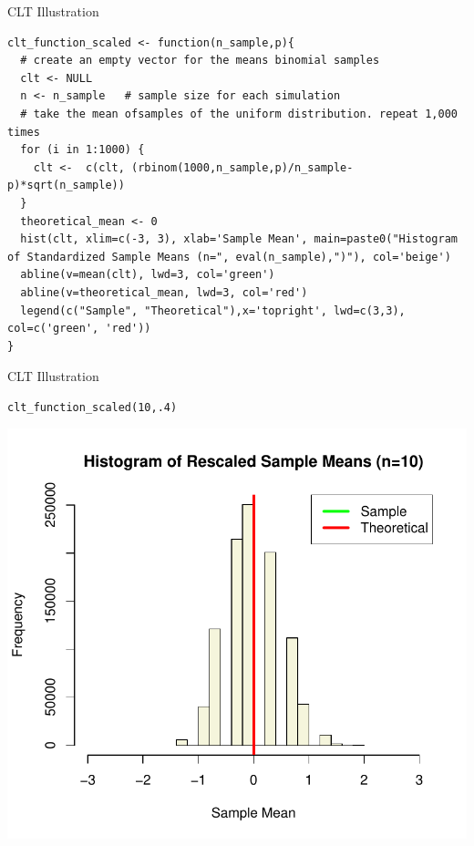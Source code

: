 \begin{frame}[fragile]{CLT Illustration}
\begin{lstlisting}
clt_function_scaled <- function(n_sample,p){
  # create an empty vector for the means binomial samples
  clt <- NULL
  n <- n_sample   # sample size for each simulation
  # take the mean ofsamples of the uniform distribution. repeat 1,000 times
  for (i in 1:1000) {
    clt <-  c(clt, (rbinom(1000,n_sample,p)/n_sample-p)*sqrt(n_sample))
  }
  theoretical_mean <- 0
  hist(clt, xlim=c(-3, 3), xlab='Sample Mean', main=paste0("Histogram of Standardized Sample Means (n=", eval(n_sample),")"), col='beige')
  abline(v=mean(clt), lwd=3, col='green')
  abline(v=theoretical_mean, lwd=3, col='red')
  legend(c("Sample", "Theoretical"),x='topright', lwd=c(3,3), col=c('green', 'red'))
}
\end{lstlisting}
\end{frame}

\begin{frame}[fragile]{CLT Illustration}
\begin{lstlisting}
clt_function_scaled(10,.4)
\end{lstlisting}
\begin{center}
\includegraphics[height=.8\textheight]{clts10}
\end{center}
\end{frame}


